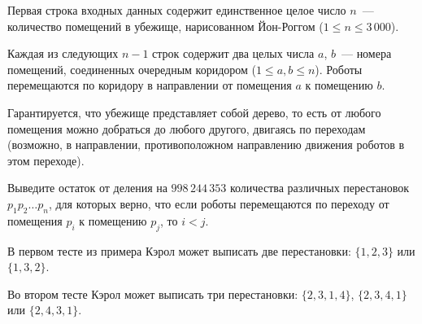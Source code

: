 \begin{problem}
\InputFile

Первая строка входных данных содержит единственное целое число $n$~--- количество помещений в убежище, нарисованном Йон-Роггом ($1 \le n \le 3\,000$).

Каждая из следующих $n - 1$ строк содержит два целых числа $a$, $b$~--- номера помещений, соединенных очередным коридором ($1 \le a, b \le n$). Роботы перемещаются по коридору в направлении от помещения $a$ к помещению $b$.

Гарантируется, что убежище представляет собой дерево, то есть от любого помещения можно добраться до любого другого, двигаясь по переходам (возможно, в направлении, противоположном направлению движения роботов в этом переходе).

\OutputFile

Выведите остаток от деления на $998\,244\,353$ количества различных перестановок $p_1 p_2 \ldots p_n$, для которых верно, что если роботы перемещаются по переходу от помещения $p_i$ к помещению $p_j$, то $i < j$.

\Examples

\begin{example}
%
%
\end{example}

\Note

В первом тесте из примера Кэрол может выписать две перестановки: $\{1, 2, 3\}$ или $\{1, 3, 2\}$.

Во втором тесте Кэрол может выписать три перестановки: $\{2, 3, 1, 4\}$, $\{2, 3, 4, 1\}$ или $\{2, 4, 3, 1\}$.

\end{problem}